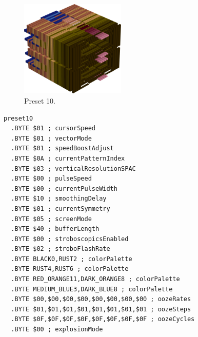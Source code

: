 \begin{minipage}[b]{0.48\linewidth}
\begin{figure}[H]                                                          
  \centering                                                             
  \begin{adjustbox}{width=5cm,center}                                   
  \includegraphics[width=5cm]{src/colorspace_presets/preset10-45.png}%
  \end{adjustbox}                                                        
\caption*{Preset 10.}                                           
\end{figure}                                                               
\end{minipage}
\hspace{0.1cm}
\begin{minipage}[b]{0.48\linewidth}                                       
\begin{lstlisting}[basicstyle=\ttfamily\tiny]
preset10
  .BYTE $01 ; cursorSpeed
  .BYTE $01 ; vectorMode
  .BYTE $01 ; speedBoostAdjust
  .BYTE $0A ; currentPatternIndex
  .BYTE $03 ; verticalResolutionSPAC
  .BYTE $00 ; pulseSpeed
  .BYTE $00 ; currentPulseWidth
  .BYTE $10 ; smoothingDelay
  .BYTE $01 ; currentSymmetry
  .BYTE $05 ; screenMode
  .BYTE $40 ; bufferLength
  .BYTE $00 ; stroboscopicsEnabled
  .BYTE $02 ; stroboFlashRate
  .BYTE BLACK0,RUST2 ; colorPalette
  .BYTE RUST4,RUST6 ; colorPalette
  .BYTE RED_ORANGE11,DARK_ORANGE8 ; colorPalette
  .BYTE MEDIUM_BLUE3,DARK_BLUE8 ; colorPalette
  .BYTE $00,$00,$00,$00,$00,$00,$00,$00 ; oozeRates
  .BYTE $01,$01,$01,$01,$01,$01,$01,$01 ; oozeSteps
  .BYTE $0F,$0F,$0F,$0F,$0F,$0F,$0F,$0F ; oozeCycles
  .BYTE $00 ; explosionMode
\end{lstlisting}
\end{minipage}

